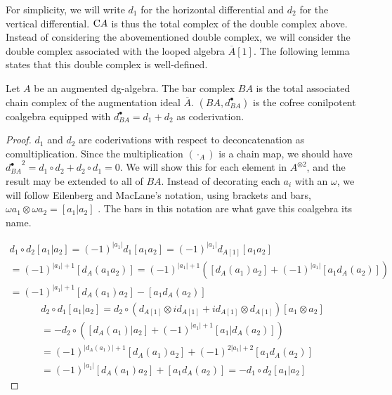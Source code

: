 \documentclass[../thesis.tex]{subfiles}
\begin{document}
            For simplicity, we will write $d_1$ for the horizontal differential and $d_2$ for the vertical differential. $\tt{C}A$ is thus the total complex of the double complex above. Instead of considering the abovementioned double complex, we will consider the double complex associated with the looped algebra $\overline{A}[1]$. The following lemma states that this double complex is well-defined.
            
            \begin{proposition}
                Let $A$ be an augmented dg-algebra. The bar complex $BA$ is the total associated chain complex of the augmentation ideal $\overline{A}$. $(BA, d_{BA}^\bullet)$ is the cofree conilpotent coalgebra equipped with $d_{BA}^\bullet = d_1 + d_2$ as coderivation.
            \end{proposition}

            \begin{proof}
                    $d_1$ and $d_2$ are coderivations with respect to deconcatenation as comultiplication. Since the multiplication $(\cdot_A)$ is a chain map, we should have ${d_{BA}^\bullet}^2 = d_1 \circ d_2 + d_2 \circ d_1= 0$. We will show this for each element in $A^{\otimes 2}$, and the result may be extended to all of $BA$. Instead of decorating each $a_i$ with an $\omega$, we will follow Eilenberg and MacLane's notation, using brackets and bars, $\omega a_1 \otimes \omega a_2 = [a_1 | a_2]$ \cite[73]{Eilenberg53}. The bars in this notation are what gave this coalgebra its name.

                \begin{multline*}
                    d_1 \circ d_2 [a_1 | a_2] = (-1)^{|a_1|}d_1 [a_1a_2] = (-1)^{|a_1|}d_{A[1]}[a_1a_2] \\ = (-1)^{|a_1|+1}[d_A(a_1a_2)] = (-1)^{|a_1|+1}([d_A(a_1)a_2] + (-1)^{|a_1|}[a_1d_A(a_2)]) \\ = (-1)^{|a_1|+1}[d_A(a_1)a_2] - [a_1d_A(a_2)]
                \end{multline*}
                \begin{multline*}
                    d_2\circ d_1 [a_1 | a_2] = d_2\circ (d_{A[1]}\otimes id_{A[1]} + id_{A[1]}\otimes d_{A[1]}) [a_1\otimes a_2] \\ = -d_2 \circ ([d_A(a_1) | a_2] + (-1)^{|a_1|+1}[a_1 | d_A(a_2)]) \\ = (-1)^{|d_A(a_1)|+1}[d_A(a_1)a_2] + (-1)^{2|a_1|+2}[a_1d_A(a_2)] \\ = (-1)^{|a_1|}[d_A(a_1)a_2] + [a_1d_A(a_2)] = -d_1\circ d_2 [a_1 | a_2]
                \end{multline*}
            \end{proof}
\end{document}
